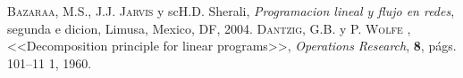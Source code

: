 \begin{thebibliography}{X}
	 \textsc{Bazaraa, M.S., J.J. Jarvis} y \text
	sc{H.D. Sherali},
	\textit{Programaci\’on lineal y flujo en redes}, segunda e
	dici\’on,
	Limusa, M\’exico, DF, 2004.
	 \textsc{Dantzig, G.B.} y \textsc{P. Wolfe}
	,
	<<Decomposition principle for linear programs>>,
	\textit{Operations Research}, \textbf{8}, págs. 101--11
	1, 1960.
\end{thebibliography}